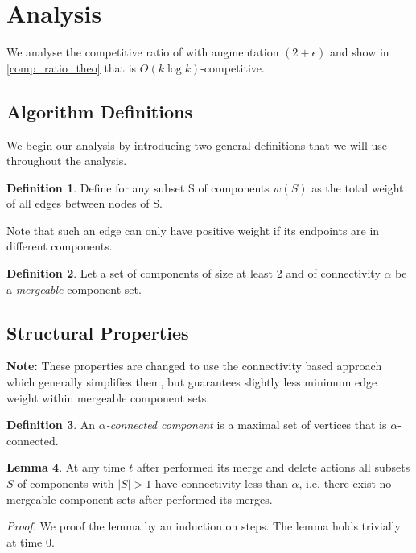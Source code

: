 \documentclass[a4paper,xcolor=dvipsnames, tikz, 12pt]{article}
\newcommand{\crep}{\text{C{\scriptsize REP}}}
\theoremstyle{definition}
\newtheorem{defi}{Definition}
\newtheorem{lemma}[defi]{Lemma}
\begin{document}
	

\section{Analysis}
We analyse the competitive ratio of \crep{} with augmentation $(2+\epsilon)$ and show in \cref{comp_ratio_theo} that \crep{} is $O(k\log k)$-competitive.
\label{analysisSection}

\subsection{Algorithm Definitions}
We begin our analysis by introducing two general definitions that we will use throughout the analysis.

\begin{defi}
	Define for any subset S of components $w(S)$ as the total weight of all edges between nodes of S.
\end{defi}

Note that such an edge can only have positive weight if its endpoints are in different components.

\begin{defi}
	Let a set of components of size at least 2 and of connectivity $\alpha$ be a \textit{mergeable} component set.	
\end{defi}


\subsection{Structural Properties}


\textbf{Note:} These properties are changed to use the connectivity based approach which generally simplifies them, but guarantees slightly less minimum edge weight within mergeable component sets.
\begin{defi}
	An $\alpha$\textit{-connected component} is a maximal set of vertices that is $\alpha$-connected.
\end{defi}

\begin{lemma}
	At any time $t$ after \crep{} performed its merge and delete actions all subsets $S$ of components with $|S|>1$ have connectivity less than $\alpha$, i.e. there exist no mergeable component sets after \crep{} performed its merges.
\end{lemma}

\textit{Proof.} We proof the lemma by an induction on steps. The lemma holds trivially at time 0.
\end{document}
